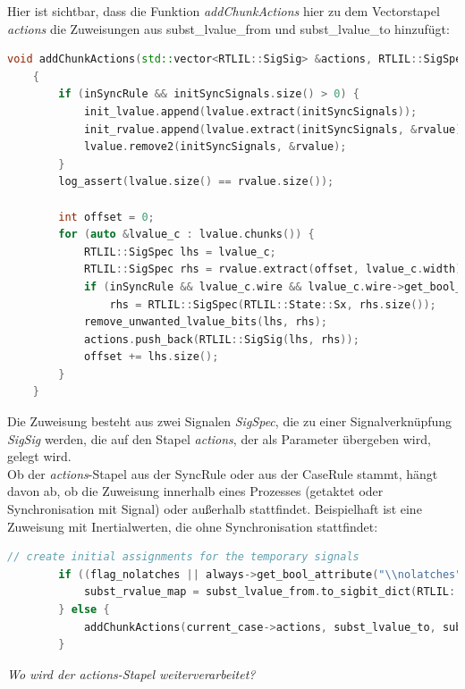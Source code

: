 \documentclass[11pt]{report}
\begin{document}
Hier ist sichtbar, dass die Funktion \textit{addChunkActions} hier zu dem Vectorstapel \textit{actions} die Zuweisungen aus subst\_lvalue\_from und subst\_lvalue\_to hinzufügt:
\begin{lstlisting}[language=C++]
void addChunkActions(std::vector<RTLIL::SigSig> &actions, RTLIL::SigSpec lvalue, RTLIL::SigSpec rvalue, bool inSyncRule = false)
	{
		if (inSyncRule && initSyncSignals.size() > 0) {
			init_lvalue.append(lvalue.extract(initSyncSignals));
			init_rvalue.append(lvalue.extract(initSyncSignals, &rvalue));
			lvalue.remove2(initSyncSignals, &rvalue);
		}
		log_assert(lvalue.size() == rvalue.size());

		int offset = 0;
		for (auto &lvalue_c : lvalue.chunks()) {
			RTLIL::SigSpec lhs = lvalue_c;
			RTLIL::SigSpec rhs = rvalue.extract(offset, lvalue_c.width);
			if (inSyncRule && lvalue_c.wire && lvalue_c.wire->get_bool_attribute("\\nosync"))
				rhs = RTLIL::SigSpec(RTLIL::State::Sx, rhs.size());
			remove_unwanted_lvalue_bits(lhs, rhs);
			actions.push_back(RTLIL::SigSig(lhs, rhs));
			offset += lhs.size();
		}
	}

\end{lstlisting}

Die Zuweisung besteht aus zwei Signalen \textit{SigSpec}, die zu einer Signalverknüpfung \textit{SigSig} werden, die auf den Stapel \textit{actions}, der als Parameter übergeben wird, gelegt wird.\\
Ob der \textit{actions}-Stapel aus der SyncRule oder aus der CaseRule stammt, hängt davon ab, ob die Zuweisung innerhalb eines Prozesses (getaktet oder Synchronisation mit Signal) oder außerhalb stattfindet.
Beispielhaft ist eine Zuweisung mit Inertialwerten, die ohne Synchronisation stattfindet:
\begin{lstlisting}[language=C++]
// create initial assignments for the temporary signals
		if ((flag_nolatches || always->get_bool_attribute("\\nolatches") || current_module->get_bool_attribute("\\nolatches")) && !found_clocked_sync) {
			subst_rvalue_map = subst_lvalue_from.to_sigbit_dict(RTLIL::SigSpec(RTLIL::State::Sx, GetSize(subst_lvalue_from)));
		} else {
			addChunkActions(current_case->actions, subst_lvalue_to, subst_lvalue_from);
		}
\end{lstlisting}
\textit{Wo wird der actions-Stapel weiterverarbeitet?}
\end{document}
